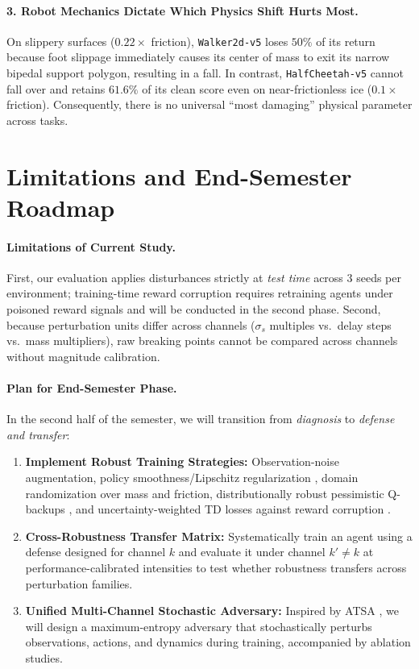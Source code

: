 \documentclass{article}
\begin{document}
\paragraph{3. Robot Mechanics Dictate Which Physics Shift Hurts Most.}
On slippery surfaces ($0.22\times$ friction), \texttt{Walker2d-v5} loses $50\%$ of its return because foot slippage immediately causes its center of mass to exit its narrow bipedal support polygon, resulting in a fall. In contrast, \texttt{HalfCheetah-v5} cannot fall over and retains $61.6\%$ of its clean score even on near-frictionless ice ($0.1\times$ friction). Consequently, there is no universal ``most damaging'' physical parameter across tasks.


\section{Limitations and End-Semester Roadmap}

\paragraph{Limitations of Current Study.}
First, our evaluation applies disturbances strictly at \emph{test time} across $3$ seeds per environment; training-time reward corruption requires retraining agents under poisoned reward signals and will be conducted in the second phase. Second, because perturbation units differ across channels ($\sigma_s$ multiples vs.\ delay steps vs.\ mass multipliers), raw breaking points cannot be compared across channels without magnitude calibration.

\paragraph{Plan for End-Semester Phase.}
In the second half of the semester, we will transition from \emph{diagnosis} to \emph{defense and transfer}:
\begin{enumerate}
    \item \textbf{Implement Robust Training Strategies:} Observation-noise augmentation, policy smoothness/Lipschitz regularization \citep{zhang2020robust}, domain randomization over mass and friction, distributionally robust pessimistic Q-backups \citep{liang2024single}, and uncertainty-weighted TD losses against reward corruption \citep{ye2024towards}.
    \item \textbf{Cross-Robustness Transfer Matrix:} Systematically train an agent using a defense designed for channel $k$ and evaluate it under channel $k' \neq k$ at performance-calibrated intensities to test whether robustness transfers across perturbation families.
    \item \textbf{Unified Multi-Channel Stochastic Adversary:} Inspired by ATSA \citep{zhou2025robust}, we will design a maximum-entropy adversary that stochastically perturbs observations, actions, and dynamics during training, accompanied by ablation studies.
\end{enumerate}



\end{document}
